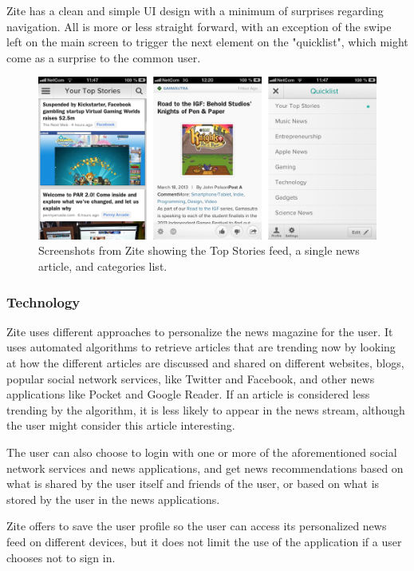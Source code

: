 Zite has a clean and simple UI design with a minimum of surprises regarding navigation. All is more or less straight forward, with an exception of the swipe left on the main screen to trigger the next element on the "quicklist", which might come as a surprise to the common user.

\begin{figure}[!htbp]
\centering
\includegraphics[width=130mm]{GFX/screenshots/zite.png}
\caption{Screenshots from Zite showing the Top Stories feed, a single news article, and categories list.}
\label{screenshots_zite}
\end{figure}

\subsubsection{Technology}
Zite uses different approaches to personalize the news magazine for the user\cite{zite_faq}. It uses automated algorithms to retrieve articles that are trending now by looking at how the different articles are discussed and shared on different websites, blogs, popular social network services, like Twitter and Facebook, and other news applications like Pocket and Google Reader. If an article is considered less trending by the algorithm, it is less likely to appear in the news stream, although the user might consider this article interesting.

The user can also choose to login with one or more of the aforementioned social network services and news applications, and get news recommendations based on what is shared by the user itself and friends of the user, or based on what is stored by the user in the news applications. 

Zite offers to save the user profile so the user can access its personalized news feed on different devices, but it does not limit the use of the application if a user chooses not to sign in.

